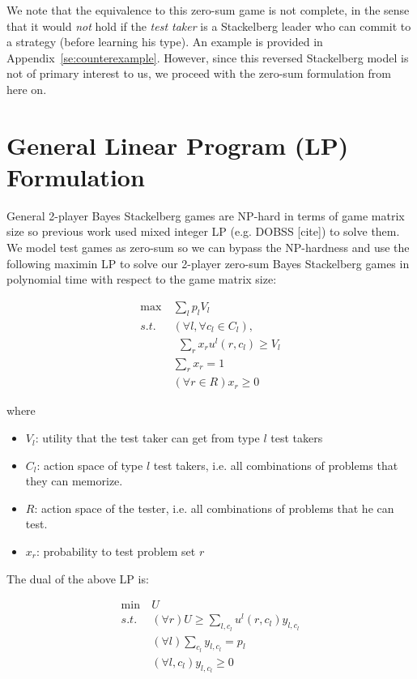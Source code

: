 \documentclass{article}
\begin{document}
We note that the equivalence to this zero-sum game is not complete, in the
sense that it would {\em not} hold if the {\em test taker} is a Stackelberg
leader who can commit to a strategy (before learning his type).  An example
is provided in Appendix~\ref{se:counterexample}.  However, since this
reversed Stackelberg model is not of primary interest to
us, we proceed with the zero-sum formulation from here on.


\section{General Linear Program (LP) Formulation}

General 2-player Bayes Stackelberg games are NP-hard in terms of game matrix
size so previous work used mixed integer LP (e.g. DOBSS [cite]) to solve them.
We model test games as zero-sum so we can bypass the NP-hardness and use the
following maximin LP to solve our 2-player zero-sum Bayes Stackelberg games in
polynomial time with respect to the game matrix size:

\begin{align}\label{eqn:maximin}
	\max~ &\sum_l p_l V_l \\
	s.t.~ &(\forall l, \forall c_l \in C_l),\nonumber\\
	&~~ \sum_r x_r u^l(r, c_l) \geq V_l\nonumber\\
	&\sum_r x_r = 1\nonumber\\
	&(\forall r \in R) x_r \geq 0\nonumber
\end{align}

where 
\begin{itemize}

 \item $V_l$: utility that the test taker can get from type $l$ test takers

 \item $C_l$: action space of type $l$ test takers, i.e. all combinations of
 problems that they can memorize.

 \item $R$: action space of the tester, i.e. all combinations of problems that
 he can test.
 
 \item $x_r$: probability to test problem set $r$

\end{itemize}

The dual of the above LP is:

\begin{align}\label{eqn:dual-original}
  \min~&U\\
  s.t. &(\forall r) U \geq \sum_{l, c_l} u^l(r, c_l) y_{l, c_l}\nonumber\\
  &(\forall l) \sum_{c_l} y_{l, c_l} = p_l\nonumber\\
  &(\forall l, c_l) y_{l, c_l} \geq 0 \nonumber
\end{align}
\end{document}
